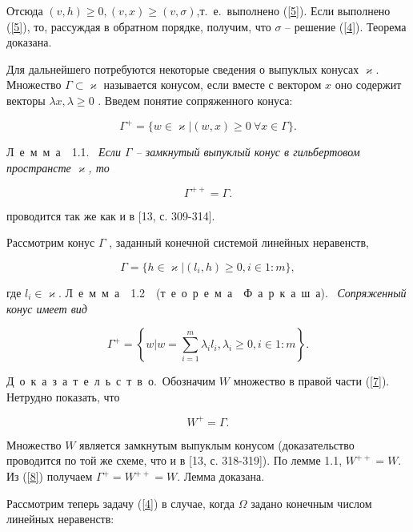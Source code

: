 \documentclass{book}
\newcommand{\idest}{т.~е.\ }
\newcommand{\proof}{Д~о~к~а~з~а~т~е~л~ь~с~т~в~о.\ }
\newcommand{\lemma}[1]{Л~е~м~м~а~~#1.\ }
\begin{document}
Отсюда $(v, h)\geq0, (v, x)\geq(v, \sigma)$,\idest выполнено (\ref{5}). Если выполнено (\ref{5}), то, рассуждая в обратном порядке, получим, что $\sigma$ -- решение (\ref{4}). Теорема доказана.
\par Для дальнейшего потребуются некоторые сведения о выпуклых конусах $\varkappa$. Множество $\Gamma\subset\varkappa$ называется конусом, если вместе с вектором $x$ оно содержит векторы $\lambda x, \lambda\geq0$ . Введем понятие сопряженного конуса:

\begin{equation*}
\Gamma^+=\{w\in\varkappa|(w, x)\geq0\  \forall x\in\Gamma\}.
\end{equation*}

\par\lemma{1.1} \textit{Если $\Gamma$ -- замкнутый выпуклый конус в гильбертовом пространсте $\varkappa$, то}

\begin{equation}
\Gamma^{++}=\Gamma.
\label{6}
\end{equation}

 проводится так же как и в [13, с. 309-314].
\par Рассмотрим конус $\Gamma$ , заданный конечной системой линейных неравенств,

\begin{equation*}
\Gamma=\{h\in\varkappa|(l_i, h)\geq0, i\in1:m\},
\end{equation*}

\noindent где $l_i\in\varkappa$.
\lemma{1.2~~(т~е~о~р~е~м~а~~Ф~а~р~к~а~ш~а)} \textit{Сопряженный конус имеет вид}

\begin{equation}
\Gamma^{+}=\left\{w|w=\sum_{i=1}^m\lambda_il_i, \lambda_i\geq0, i\in1:m\right\}.
\label{7}
\end{equation}

\par \proof Обозначим $W$ множество в правой части (\ref{7}). Нетрудно показать, что

\begin{equation}
W^+=\Gamma.
\label{8}
\end{equation}

\noindent Множество $W$ является замкнутым выпуклым конусом (доказательство проводится по той же схеме, что и в [13, с. 318-319]). По лемме 1.1, $W^{++}=W$. Из (\ref{8}) получаем $\Gamma^+=W^{++}=W$. Лемма доказана.
\par Рассмотрим теперь задачу (\ref{4}) в случае, когда $\Omega$ задано конечным числом линейных неравенств:
\end{document}
